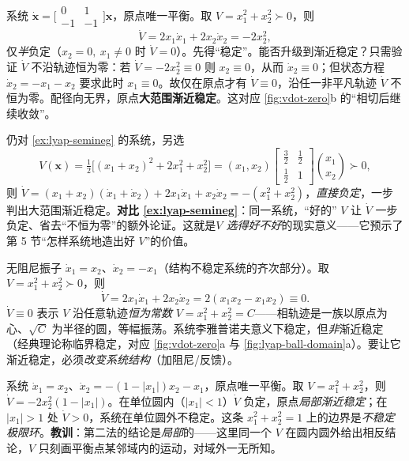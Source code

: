 \begin{example}\label{ex:lyap-semineg}
系统 $\dot{\mathbf{x}}=\big[\begin{smallmatrix}0&1\\-1&-1\end{smallmatrix}\big]\mathbf{x}$，原点唯一平衡。取 $V=x_1^2+x_2^2\succ0$，则
\[
  \dot V=2x_1\dot x_1+2x_2\dot x_2=-2x_2^2,
\]
仅\emph{半}负定（$x_2=0,\ x_1\neq0$ 时 $\dot V=0$）。先得“稳定”。能否升级到渐近稳定？只需验证 $\dot V$ 不沿轨迹恒为零：若 $\dot V=-2x_2^2\equiv0$ 则 $x_2\equiv0$，从而 $\dot x_2\equiv0$；但状态方程 $\dot x_2=-x_1-x_2$ 要求此时 $x_1\equiv0$。故仅在原点才有 $\dot V\equiv0$，沿任一非平凡轨迹 $\dot V$ 不恒为零。配径向无界，原点\textbf{大范围渐近稳定}。这对应 \cref{fig:vdot-zero}b 的“相切后继续收敛”。
\end{example}

\begin{example}\label{ex:lyap-multiV}
仍对 \cref{ex:lyap-semineg} 的系统，另选
\[
  V(\mathbf{x})=\tfrac12\big[(x_1+x_2)^2+2x_1^2+x_2^2\big]
  =(x_1,x_2)\begin{bmatrix}\tfrac32&\tfrac12\\[2pt]\tfrac12&1\end{bmatrix}\!\binom{x_1}{x_2}\succ0,
\]
则 $\dot V=(x_1+x_2)(\dot x_1+\dot x_2)+2x_1\dot x_1+x_2\dot x_2=-(x_1^2+x_2^2)$，\emph{直接负定}，一步判出大范围渐近稳定。\textbf{对比 \cref{ex:lyap-semineg}}：同一系统，“好的” $V$ 让 $\dot V$ 一步负定、省去“不恒为零”的额外论证。这就是\emph{$V$ 选得好不好}的现实意义——它预示了第 5 节“怎样系统地造出好 $V$”的价值。
\end{example}

\begin{example}\label{ex:lyap-critical}
无阻尼振子 $\dot x_1=x_2$、$\dot x_2=-x_1$（结构不稳定系统的齐次部分）。取 $V=x_1^2+x_2^2\succ0$，则
\[
  \dot V=2x_1\dot x_1+2x_2\dot x_2=2(x_1x_2-x_1x_2)\equiv0.
\]
$\dot V\equiv0$ 表示 $V$ 沿任意轨迹\emph{恒为常数} $V=x_1^2+x_2^2=C$——相轨迹是一族以原点为心、$\sqrt C$ 为半径的圆，等幅振荡。系统李雅普诺夫意义下稳定，但\emph{非}渐近稳定（经典理论称临界稳定，对应 \cref{fig:vdot-zero}a 与 \cref{fig:lyap-ball-domain}a）。要让它渐近稳定，必须\emph{改变系统结构}（加阻尼/反馈）。
\end{example}

\begin{example}\label{ex:lyap-limitcycle}
系统 $\dot x_1=x_2$、$\dot x_2=-(1-|x_1|)x_2-x_1$，原点唯一平衡。取 $V=x_1^2+x_2^2$，则 $\dot V=-2x_2^2(1-|x_1|)$。在单位圆内（$|x_1|<1$）$\dot V$ 负定，原点\emph{局部渐近稳定}；在 $|x_1|>1$ 处 $\dot V>0$，系统在单位圆外不稳定。这条 $x_1^2+x_2^2=1$ 上的边界是\emph{不稳定极限环}。\textbf{教训}：第二法的结论是\emph{局部}的——这里同一个 $V$ 在圆内圆外给出相反结论，$V$ 只刻画平衡点某邻域内的运动，对域外一无所知。
\end{example}

